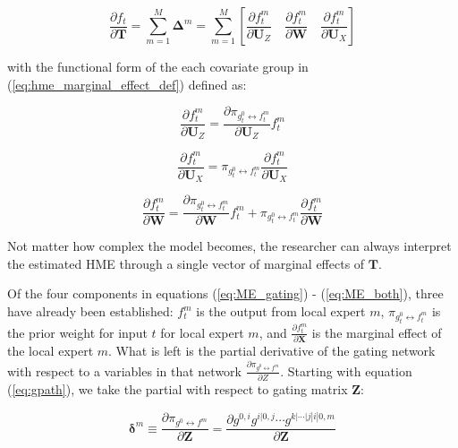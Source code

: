 \documentclass[12pt]{article}
\newcommand{\gateprod}[2]{\pi_{#1 \longleftrightarrow #2}}
\begin{document}
\begin{equation} \label{eq:hme_marginal_effect_def}
  \frac{\partial f_{t}}{\partial \boldsymbol{T}} = \sum_{m=1}^{M} \boldsymbol{\Delta}^{m} = \sum_{m=1}^{M} \left[ \frac{\partial f^{m}_{t}}{\partial \boldsymbol{U}_{Z}}   \quad   \frac{\partial f^{m}_{t}}{\partial \boldsymbol{W}}   \quad   \frac{\partial f^{m}_{t}}{\partial \boldsymbol{U}_{X}}   \right]
\end{equation}

with the functional form of the each covariate group in (\ref{eq:hme_marginal_effect_def})
defined as:


\begin{equation} \label{eq:ME_gating}
  \frac{\partial f_{t}^{m}}{\partial \boldsymbol{U}_{Z}} = \frac{\partial \gateprod{g^{0}_{t}}{f^{m}_{t}}}{{\partial \boldsymbol{U}_{Z}}}f^{m}_{t}
\end{equation}


\begin{equation} \label{eq:ME_expert}
  \frac{\partial f_{t}^{m}}{\partial \boldsymbol{U}_{X}} = \gateprod{g^{0}_{t}}{f^{m}_{t}} \frac{\partial f^{m}_{t}}{{\partial \boldsymbol{U}_{X}}}
\end{equation}


\begin{equation} \label{eq:ME_both}
  \frac{\partial f_{t}^{m}}{\partial \boldsymbol{W}} = \frac{\partial \gateprod{g^{0}_{t}}{f^{m}_{t}}}{{\partial \boldsymbol{W}}}f^{m}_{t} + \gateprod{g^{0}_{t}}{f^{m}_{t}} \frac{\partial f^{m}_{t}}{{\partial \boldsymbol{W}}}
\end{equation}

Not matter how complex the model becomes, the researcher can always interpret
the estimated HME through a single vector of marginal effects of $\boldsymbol{T}$.

Of the four components in equations (\ref{eq:ME_gating}) - (\ref{eq:ME_both}),
three have already been established: $f_{t}^{m}$ is the output from local
expert $m$, $\gateprod{g^{0}_{t}}{f^{m}_{t}}$ is the prior weight for
input $t$ for local expert $m$, and $\frac{\partial f^{m}_{t}}{{\partial \boldsymbol{X}}}$
is the marginal effect of the local expert $m$. What is left is the
partial derivative of the gating network with respect to a variables
in that network $\frac{\partial \gateprod{g^{0}}{f^{m}}}{\partial Z}$.
Starting with equation (\ref{eq:gpath}), we take the partial with
respect to gating matrix $\boldsymbol{Z}$:

\begin{equation}
  \boldsymbol{\delta}^{m} \equiv \frac{\partial \gateprod{g^{0}}{f^{m}}}{\partial \boldsymbol{Z}} = \frac{\partial g^{0, i} g^{i|0, j} \cdots g^{k|\cdots|j|i|0, m}}{\partial \boldsymbol{Z}}
\end{equation}
\end{document}
